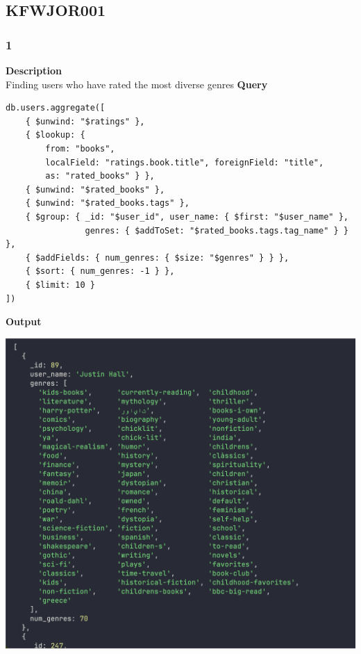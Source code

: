 \documentclass[11pt]{article}
\begin{document}
\subsection{KFWJOR001}
\label{sec:org63164a6}
\subsubsection{1}
\label{sec:org1ca5c7a}
\textbf{Description}\\
Finding users who have rated the most diverse genres
\linebreak
\textbf{Query}
\begin{verbatim}
db.users.aggregate([
    { $unwind: "$ratings" },
    { $lookup: {
        from: "books",
        localField: "ratings.book.title", foreignField: "title",
        as: "rated_books" } },
    { $unwind: "$rated_books" },
    { $unwind: "$rated_books.tags" },
    { $group: { _id: "$user_id", user_name: { $first: "$user_name" },
                genres: { $addToSet: "$rated_books.tags.tag_name" } } },
    { $addFields: { num_genres: { $size: "$genres" } } },
    { $sort: { num_genres: -1 } },
    { $limit: 10 }
])
\end{verbatim}

\linebreak
\textbf{Output}\\
\begin{center}
\includegraphics[width=1\textwidth]{images/KFWJOR001/1.png}
\end{center}
\pagebreak
\end{document}
